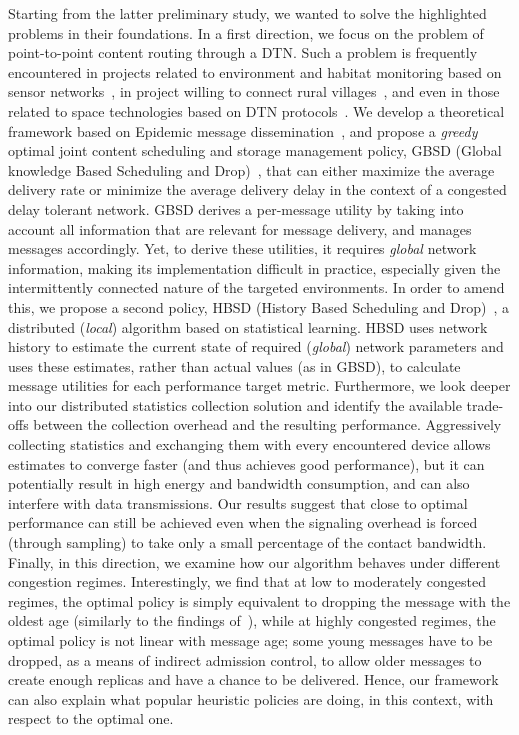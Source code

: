Starting from the latter preliminary study, we wanted to solve the highlighted problems in their foundations. In a first direction, we focus on the problem of point-to-point content routing through a DTN. Such a problem is frequently encountered in projects related to environment and habitat monitoring based on sensor networks~\cite{MOMO, ARNETMINER}, in project willing to connect rural villages~\cite{ResiliNets, UMassDieselNet, KIOSKNET, BYTEWALLA, TIER}, and even in those related to space technologies based on DTN protocols~\cite{BioServe, Saratoga}. We develop a theoretical framework based on Epidemic message dissemination~\cite{haas:mobihoc03,Inria:MessageDelay,akis:mobihoc06}, and propose a \emph{greedy} optimal joint content scheduling and storage management policy, GBSD (Global knowledge Based Scheduling and Drop)~\cite{KrifaBS08, HBSDDTN2}, that can either maximize the average delivery rate or minimize the average delivery delay in the context of a congested delay tolerant network. GBSD derives a per-message utility by taking into account all information that are relevant for message delivery, and manages messages accordingly. Yet, to derive these utilities, it requires \textit{global} network information, making its implementation difficult in practice, especially given the intermittently connected nature of the targeted environments. In order to amend this, we propose a second policy, HBSD (History Based Scheduling and Drop)~\cite{KrifaBS08, HBSDDTN2}, a distributed (\textit{local}) algorithm based on statistical learning. HBSD uses network history to estimate the current state of required (\textit{global}) network parameters and uses these estimates, rather than actual values (as in GBSD), to calculate message utilities for each performance target metric. Furthermore, we look deeper into our distributed statistics collection solution and identify the available trade-offs between the collection overhead and the resulting performance. Aggressively collecting statistics and exchanging them with every encountered device allows estimates to converge faster (and thus achieves good performance), but it can potentially result in high energy and bandwidth consumption, and can also interfere with data transmissions. Our results suggest that close to optimal performance can still be achieved even when the signaling overhead is forced (through sampling) to take only a small percentage of the contact bandwidth. Finally, in this direction, we examine how our algorithm behaves under different congestion regimes. Interestingly, we find that at low to moderately congested regimes, the optimal policy is simply equivalent to dropping the message with the oldest age (similarly to the findings of~\cite{QueuingPolicies}), while at highly congested regimes, the optimal policy is not linear with message age; some young messages have to be dropped, as a means of indirect admission control, to allow older messages to create enough replicas and have a chance to be delivered. Hence, our framework can also explain what popular heuristic policies are doing, in this context, with respect to the optimal one.

